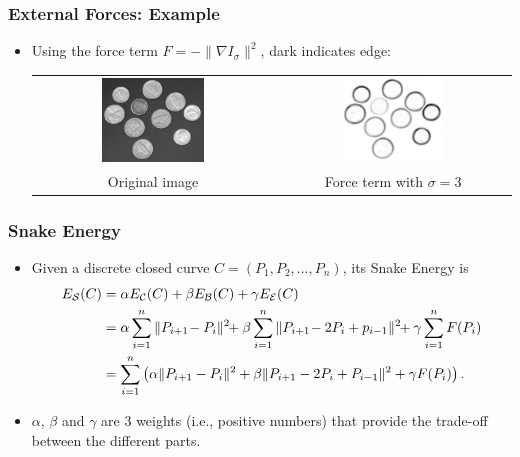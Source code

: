 \documentclass[10pt]{beamer}
\begin{document}
 \begin{frame}
   \frametitle{External Forces: Example}
   \begin{itemize}
   \item Using the force term $F= -\|\nabla I_\sigma\|^2$, dark indicates edge:
     \begin{center}
       \begin{tabular}[h]{cc}
          \includegraphics[width=0.45\textwidth]{IMAGES/coins} & 
          \includegraphics[width=0.45\textwidth]{IMAGES/cannyextcoins} \\
          Original image & Force term with $\sigma = 3$
       \end{tabular}
     \end{center}
   \end{itemize}
 \end{frame}

 \begin{frame}
   \frametitle{Snake Energy}
   \begin{itemize}
   \item Given a discrete closed curve $C = (P_1,P_2,\dots,P_n)$, its Snake Energy is 
     \begin{align*}
       E_{\mathcal S}(C) &= \alpha E_{\mathcal C}(C) + \beta E_{\mathcal B}(C) + \gamma E_{\mathcal E}(C)\\
       &= \alpha\sum_{i=1}^n\|P_{i+1}\!-P_i\|^2 \!\!+ \beta\sum_{i=1}^n\|P_{i+1}\!-2P_i+p_{i-1}\|^2 \!\!+ \gamma\sum_{i=1}^n F(P_i)\\
       &=\sum_{i=1}^n\left(\alpha\|P_{i+1}-P_i\|^2+\beta\|P_{i+1}-2P_i+P_{i-1}\|^2+\gamma F(P_i)\right).
     \end{align*}
   \item $\alpha$, $\beta$ and $\gamma$ are 3 weights (i.e., positive numbers) that
     provide the trade-off between the different parts.
   \end{itemize}
 \end{frame}
\end{document}
